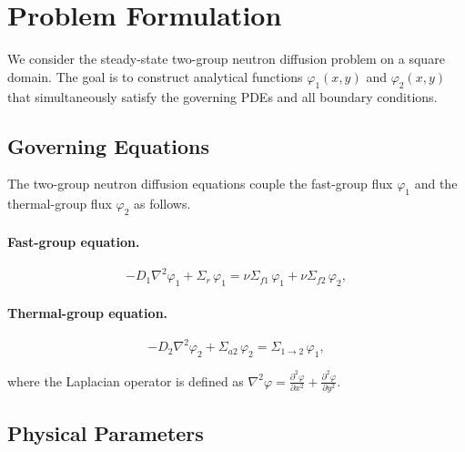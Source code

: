 \section{Problem Formulation}
\label{sec:problem}

We consider the steady-state two-group neutron diffusion problem on a square domain.
The goal is to construct analytical functions $\varphi_1(x,y)$ and $\varphi_2(x,y)$ that simultaneously satisfy the governing PDEs and all boundary conditions.

\subsection{Governing Equations}
\label{sec:governing}

The two-group neutron diffusion equations couple the fast-group flux $\varphi_1$ and the thermal-group flux $\varphi_2$ as follows.

\paragraph{Fast-group equation.}
\begin{equation}
\label{eq:fast_group}
-D_1 \nabla^2 \varphi_1 + \Sigma_r \, \varphi_1
= \nu \Sigma_{f1} \, \varphi_1 + \nu \Sigma_{f2} \, \varphi_2,
\end{equation}

\paragraph{Thermal-group equation.}
\begin{equation}
\label{eq:thermal_group}
-D_2 \nabla^2 \varphi_2 + \Sigma_{a2} \, \varphi_2
= \Sigma_{1\to2} \, \varphi_1,
\end{equation}

\noindent where the Laplacian operator is defined as
$\nabla^2 \varphi = \frac{\partial^2 \varphi}{\partial x^2} + \frac{\partial^2 \varphi}{\partial y^2}$.

\subsection{Physical Parameters}
\label{sec:parameters}

